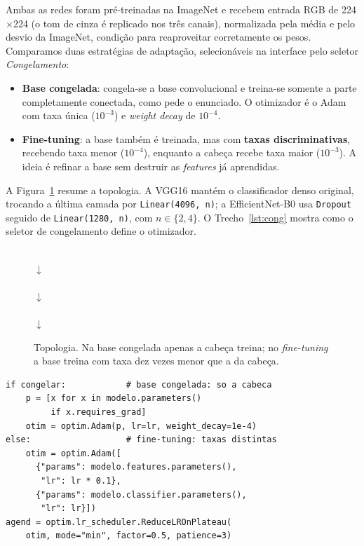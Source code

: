 \documentclass[twocolumn,a4paper,11pt]{article}
\begin{document}
Ambas as redes foram pré\nobreakdash-treinadas na ImageNet e recebem entrada RGB de
224$\times$224 (o tom de cinza é replicado nos três canais), normalizada pela média
e pelo desvio da ImageNet, condição para reaproveitar corretamente os pesos.
Comparamos duas estratégias de adaptação, selecionáveis na interface pelo seletor
\textit{Congelamento}:

\begin{itemize}
\item \textbf{Base congelada}: congela\nobreakdash-se a base convolucional e treina\nobreakdash-se
somente a parte completamente conectada, como pede o enunciado. O otimizador é o
Adam com taxa única ($10^{-3}$) e \emph{weight decay} de $10^{-4}$.
\item \textbf{Fine\nobreakdash-tuning}: a base também é treinada, mas com \textbf{taxas
discriminativas}, recebendo taxa menor ($10^{-4}$), enquanto a cabeça recebe taxa
maior ($10^{-3}$). A ideia é refinar a base sem destruir as \emph{features} já
aprendidas.
\end{itemize}

A Figura~\ref{fig:topo} resume a topologia. A VGG16 mantém o classificador denso
original, trocando a última camada por \texttt{Linear(4096, n)}; a
EfficientNet\nobreakdash-B0 usa \texttt{Dropout} seguido de \texttt{Linear(1280, n)}, com $n
\in \{2,4\}$. O Trecho~\ref{lst:cong} mostra como o seletor de congelamento define o
otimizador.

\begin{figure}[t]
\centering
\footnotesize
\setlength{\fboxsep}{5pt}
\\[3pt]
$\downarrow$\\[3pt]
\\[3pt]
$\downarrow$\\[3pt]
\\[3pt]
$\downarrow$\\[3pt]
\caption{Topologia. Na base congelada apenas a cabeça treina; no
\emph{fine\nobreakdash-tuning} a base treina com taxa dez vezes menor que a da cabeça.}
\label{fig:topo}
\end{figure}

\noindent\begin{minipage}{\linewidth}
\begin{lstlisting}[caption={Seletor de congelamento e taxas discriminativas no laço de treino.},label=lst:cong]
if congelar:            # base congelada: so a cabeca
    p = [x for x in modelo.parameters()
         if x.requires_grad]
    otim = optim.Adam(p, lr=lr, weight_decay=1e-4)
else:                   # fine-tuning: taxas distintas
    otim = optim.Adam([
      {"params": modelo.features.parameters(),
       "lr": lr * 0.1},
      {"params": modelo.classifier.parameters(),
       "lr": lr}])
agend = optim.lr_scheduler.ReduceLROnPlateau(
    otim, mode="min", factor=0.5, patience=3)
\end{lstlisting}
\end{minipage}
\end{document}
